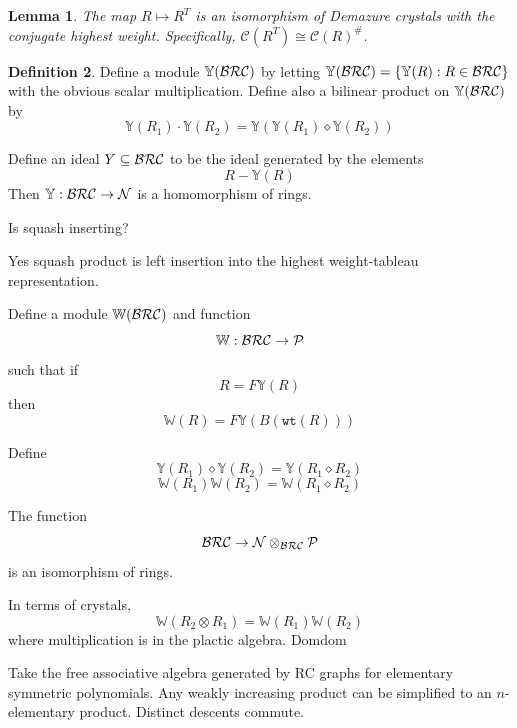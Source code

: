 \documentclass{amsart}
\newtheorem{lemma}{Lemma}[subsection]
\theoremstyle{definition}
\newtheorem{definition}[lemma]{Definition}
\theoremstyle{remark}
\numberwithin{equation}{subsection}
\newcommand{\shup}{{\uparrow}}
\newcommand{\wtt}{\mathtt{wt}}
\newcommand{\hr}{\mathtt{ht}}
\begin{document}
\begin{lemma}
  The map $R\mapsto R^T$ is an isomorphism of Demazure crystals with the conjugate highest weight. Specifically, $\mathcal{C}(R^T)\cong \mathcal{C}(R)^\#$.
\end{lemma}
\newcommand{\ltb}{\mathrm{little}}
\newcommand{\ls}{\mathrm{LS}}
\newcommand{\hw}{\mathbb{Y}}
\newcommand{\ww}{\mathbb{W}}
\begin{definition}
Define a module $\hw(\BRC)$ by letting $\hw(\BRC) = \{\hw(R): R\in \BRC\}$ with the obvious scalar multiplication. Define also a bilinear product on $\hw(\BRC)$ by
$$\hw(R_1)\cdot \hw(R_2) = \hw(\hw(R_1)\diamond \hw(R_2))$$

Define an ideal $Y\subseteq \mathcal{BRC}$ to be the ideal generated by the elements
$$R - \hw(R)$$
Then $\hw:\BRC\to\mathcal{N}$ is a homomorphism of rings.

Is squash inserting?

Yes squash product is left insertion into the highest weight-tableau representation.

Define a module $\ww(\BRC)$ and function
$$\ww:\BRC\to \mathcal{P}$$
such that if
$$R = F\hw(R)$$
then
$$\ww(R) = F\hw(B(\wtt(R)))$$

Define
$$\hw(R_1)\diamond \hw(R_2)=\hw(R_1\diamond R_2)$$
$$\ww(R_1)\ww(R_2) = \ww(R_1\diamond R_2)$$

The function 
$$\mathcal{BRC}\to \mathcal{N}\otimes_{\mathcal{BRC}} \mathcal{P}$$
is an isomorphism of rings. 


\end{definition}

In terms of crystals,
$$\ww(R_2\otimes R_1) = \ww(R_1)\ww(R_2)$$
where multiplication is in the plactic algebra. Domdom

Take the free associative algebra generated by RC graphs for elementary symmetric polynomials. Any weakly increasing product can be simplified to an $n$-elementary product. Distinct descents commute.
\end{document}
